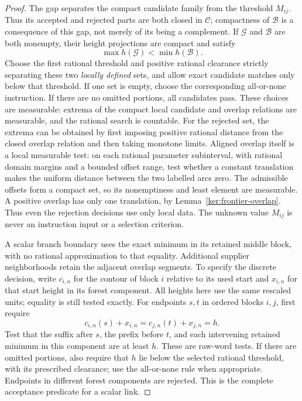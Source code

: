 \begin{proof}
The gap separates the compact candidate family from the threshold
\(M_{ij}\).  Thus its accepted and rejected parts are both closed
in \(\mathcal C\); compactness of \(\mathcal B\) is a consequence
of this gap, not merely of its being a complement.  If
\(\mathcal G\) and \(\mathcal B\) are both nonempty, their height
projections are compact and satisfy
\[
 \max h(\mathcal G)<\min h(\mathcal B).
\]
Choose the first rational threshold and positive rational clearance
strictly separating these two \emph{locally defined} sets, and allow
exact candidate matches only below that threshold.  If one set is
empty, choose the corresponding all-or-none instruction.  If there
are no omitted portions, all candidates pass.  These choices are
measurable: extrema of the compact local candidate and overlap
relations are measurable, and the rational search is countable.
For the rejected set, the extrema can be obtained by first imposing
positive rational distance from the closed overlap relation and then
taking monotone limits.  Aligned overlap itself is a local measurable
test: on each rational parameter subinterval, with rational domain
margins and a bounded offset range, test whether a constant translation
makes the uniform distance between the two labelled arcs zero.
The admissible offsets form a compact set, so its nonemptiness and
least element are measurable.  A positive overlap has only one
translation, by Lemma~\ref{ker:frontier-overlap}.  Thus even the rejection decisions use
only local data.  The unknown value \(M_{ij}\) is never an instruction
input or a selection criterion.

A scalar branch boundary uses the exact minimum in its retained
middle block, with no rational approximation to that equality.
Additional supplier neighborhoods retain the adjacent overlap
segments.  To specify the discrete decision, write $c_{i,n}$ for
the contour of block $i$ relative to its used start and $x_{i,n}$
for that start height in its forest component.  All heights here
use the same rescaled units; equality is still tested exactly.
For endpoints $s,t$ in ordered blocks $i,j$, first require
\[
 c_{i,n}(s)+x_{i,n}=c_{j,n}(t)+x_{j,n}=h.
\]
Test that the suffix after $s$, the prefix before $t$, and each
intervening retained minimum in this component are at least $h$.
These are raw-word tests.  If there are omitted portions, also
require that $h$ lie below the selected rational threshold, with
its prescribed clearance; use the all-or-none rule when appropriate.
Endpoints in different forest components are rejected.  This is
the complete acceptance predicate for a scalar link.


\end{proof}
